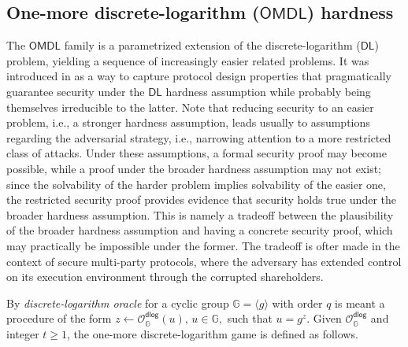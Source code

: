 \documentclass[psamsfonts, reqno]{amsart}
\theoremstyle{definition}
\theoremstyle{remark}
\numberwithin{equation}{section}
\begin{document}
\subsection{One-more discrete-logarithm ($\mathsf{OMDL}$) hardness}\label{section_omdl_hardness}

The $\mathsf{OMDL}$ family is a parametrized extension of
the discrete-logarithm ($\mathsf{DL}$) problem,
yielding a sequence of increasingly easier related problems.
It was introduced in \cite{paper_bellare_omdl}
as a way to capture protocol design properties
that pragmatically guarantee security under the $\mathsf{DL}$ hardness
assumption while probably being themselves irreducible to the latter.
Note that reducing security to an easier problem,
i.e., a stronger hardness assumption,
leads usually to assumptions
regarding the adversarial strategy,
i.e., narrowing attention to a more restricted class of attacks.
Under these assumptions,
a formal security proof may become possible,
while a proof under the broader
hardness assumption may not exist;
since the solvability of the harder problem
implies solvability of the easier one,
the restricted security proof provides
evidence that security holds
true under the broader hardness assumption.
This is namely a tradeoff between the plausibility
of the broader hardness assumption
and having a concrete security proof,
which may practically be impossible under the former.
The tradeoff is ofter made in the context of
secure multi-party protocols,
where the adversary has extended control
on its execution environment through the corrupted shareholders.

By \textit{discrete-logarithm oracle}
for a cyclic group $\mathbb{G} = \langle g \rangle$
with order $q$ is meant a procedure
of the form
$z \leftarrow \mathcal{O}_{\mathbb{G}}^{\mathsf{dlog}}(u),
\hspace{2pt} u \in \mathbb{G},$
such that
$u = g ^ z$.
Given $\mathcal{O}_{\mathbb{G}}^{\mathsf{dlog}}$
and integer $t \ge 1$,
the one-more discrete-logarithm game
is defined as follows.
\end{document}
